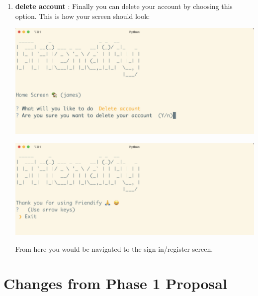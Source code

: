 \documentclass[11pt]{report}
\begin{document}
\begin{enumerate}
\begin{enumerate}
      \item {\bf delete account} : Finally you can delete your account by choosing this option. This is how your screen should look:
      
       \begin{center}
             \includegraphics[scale = .32]{Images/delete-confirm.png}
      \end{center}
      
       \begin{center}
             \includegraphics[scale = .32]{Images/delete-tankyou.png}
      \end{center}
      
      From here you would be navigated to the sign-in/register screen.
     
      \end{enumerate}
    
\end{enumerate}



\chapter{Changes from Phase 1 Proposal}
\end{document}
